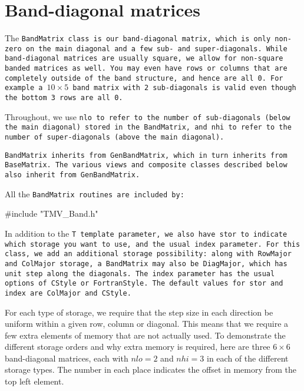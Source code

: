 
\section{Band-diagonal matrices}
\label{BandMatrix}

The \tt{BandMatrix} class is our band-diagonal matrix, which is only non-zero
on the main diagonal and a few sub- and super-diagonals.  While band-diagonal
matrices are usually square, we allow for non-square banded matrices as well.
You may even have rows or columns that are completely outside of the 
band structure, and hence are all 0.  For example a $10\times 5$ band matrix
with 2 sub-diagonals is valid even though the bottom 3 rows are all 0.

Throughout, we use \tt{nlo} to refer to the number of sub-diagonals 
(below the main diagonal) stored
in the \tt{BandMatrix}, and \tt{nhi} to refer to the number of super-diagonals
(above the main diagonal).

\tt{BandMatrix} inherits from \tt{GenBandMatrix}, which in turn inherits from
\tt{BaseMatrix}.  
The various views and composite classes described below 
also inherit from \tt{GenBandMatrix}.

All the \tt{BandMatrix} routines are included by:
\begin{tmvcode}
#include "TMV_Band.h"
\end{tmvcode}

In addition to the \tt{T} template parameter, we also have \tt{stor} to indicate 
which storage you want to use, and the usual \tt{index} parameter.
For this class, we add an additional storage possibility:
along with \tt{RowMajor} and 
\tt{ColMajor} storage, a \tt{BandMatrix} may also be \tt{DiagMajor}, which 
has unit step along the diagonals.  The \tt{index} parameter has the usual
options of \tt{CStyle} or \tt{FortranStyle}.
The default values for \tt{stor} and \tt{index} are \tt{ColMajor} and \tt{CStyle}.

For each type of storage, we require that the step size in each direction
be uniform within a given row, column or diagonal. 
This means that we require a few extra elements
of memory that are not actually used.
To demonstrate the different storage orders and why extra memory is required, 
here are three $6 \times 6$ band-diagonal
matrices, each with $nlo = 2$ and $nhi = 3$ in each of the different storage
types.  The number in each place indicates the offset in memory from the 
top left element.

